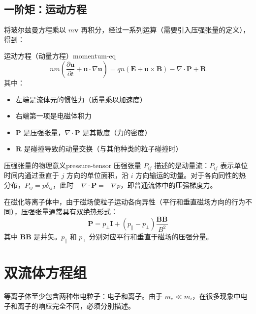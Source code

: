 \documentclass[12pt,a4paper,openany,oneside]{book}
\newcommand{\vect}[1]{\bm{#1}}
\newcommand{\grad}{\nabla}
\newcommand{\difficulty}[1]{\marginnote{\textcolor{red}{\textbf{[#1]}}}}
\begin{document}
\subsection{一阶矩：运动方程}

将玻尔兹曼方程乘以 $m\vect{v}$ 再积分，经过一系列运算（需要引入压强张量的定义），得到：

\begin{theorem}{运动方程（动量方程）}{momentum-eq}
\[
nm\left(\frac{\partial\vect{u}}{\partial t} + \vect{u}\cdot\grad\vect{u}\right) = qn(\vect{E} + \vect{u}\times\vect{B}) - \grad\cdot\bm{P} + \vect{R}
\]
其中：
\begin{itemize}
\item 左端是流体元的惯性力（质量乘以加速度）
\item 右端第一项是电磁体积力
\item $\bm{P}$ 是压强张量，$\grad\cdot\bm{P}$ 是其散度（力的密度）
\item $\vect{R}$ 是碰撞导致的动量交换（与其他种类的粒子碰撞时）
\end{itemize}
\end{theorem}

\begin{insight}{压强张量的物理意义}{pressure-tensor}
压强张量 $P_{ij}$ 描述的是动量流：$P_{ij}$ 表示单位时间内通过垂直于 $j$ 方向的单位面积，沿 $i$ 方向输运的动量。对于各向同性的热分布，$P_{ij} = p\delta_{ij}$，此时 $-\grad\cdot\bm{P} = -\grad p$，即普通流体中的压强梯度力。

在磁化等离子体中，由于磁场使粒子运动各向异性（平行和垂直磁场方向的行为不同），压强张量通常具有双绝热形式：
\[
\bm{P} = p_\perp\bm{I} + (p_\parallel - p_\perp)\frac{\vect{B}\vect{B}}{B^2}
\]
其中 $\vect{B}\vect{B}$ 是并矢。$p_\parallel$ 和 $p_\perp$ 分别对应平行和垂直于磁场的压强分量。
\end{insight}

\section{双流体方程组}\difficulty{提高}

等离子体至少包含两种带电粒子：电子和离子。由于 $m_e \ll m_i$，在很多现象中电子和离子的响应完全不同，必须分别描述。
\end{document}

